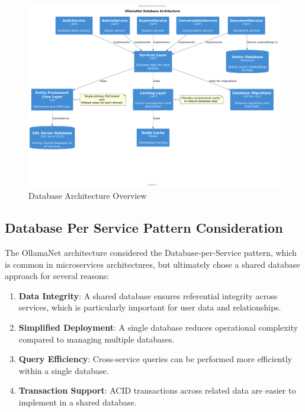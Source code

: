 \begin{figure}
    \centering
    \includegraphics[width=\textwidth]{./Chapter05/figures/database_architecture.pdf}
    \caption{Database Architecture Overview}
    \label{fig:database-architecture}
\end{figure}
\clearpage

\subsection{Database Per Service Pattern Consideration}

The OllamaNet architecture considered the Database-per-Service pattern, which is common in microservices architectures, but ultimately chose a shared database approach for several reasons:

\begin{enumerate}
   \item \textbf{Data Integrity}: A shared database ensures referential integrity across services, which is particularly important for user data and relationships.

   \item \textbf{Simplified Deployment}: A single database reduces operational complexity compared to managing multiple databases.

   \item \textbf{Query Efficiency}: Cross-service queries can be performed more efficiently within a single database.

   \item \textbf{Transaction Support}: ACID transactions across related data are easier to implement in a shared database.
\end{enumerate}

